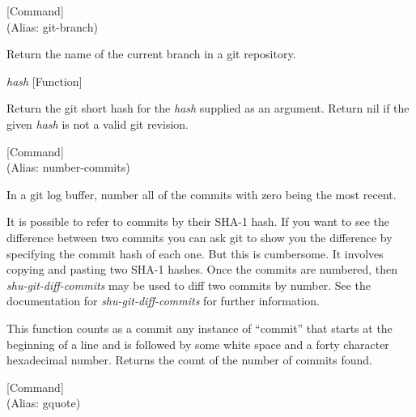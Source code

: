\vspace{1em}
\noindent
{}
\usebox{\funcname}
 \hfill [Command]\\%
 (Alias: git-branch)

\begin{doc-string}
Return the name of the current branch in a git repository.
\end{doc-string}

\vspace{1em}
\noindent
{}
\usebox{\funcname}\emph{hash}
 \hfill [Function]

\begin{doc-string}
Return the git short hash for the \emph{hash} supplied as an argument.  Return nil
if the given \emph{hash} is not a valid git revision.
\end{doc-string}

\vspace{1em}
\noindent
{}
\usebox{\funcname}
 \hfill [Command]\\%
 (Alias: number-commits)

\begin{doc-string}
In a git log buffer, number all of the commits with zero being the most
recent.

It is possible to refer to commits by their SHA-1 hash.  If you want to see the
difference between two commits you can ask git to show you the difference by
specifying the commit hash of each one.  But this is cumbersome.  It involves
copying and pasting two SHA-1 hashes.  Once the commits are numbered, then
\emph{shu-git-diff-commits} may be used to diff two commits by number.  See the
documentation for \emph{shu-git-diff-commits} for further information.

This function counts as a commit any instance of ``commit'' that starts at the
beginning of a line and is followed by some white space and a forty character
hexadecimal number.  Returns the count of the number of commits found.
\end{doc-string}

\vspace{1em}
\noindent
{}
\usebox{\funcname}
 \hfill [Command]\\%
 (Alias: gquote)

